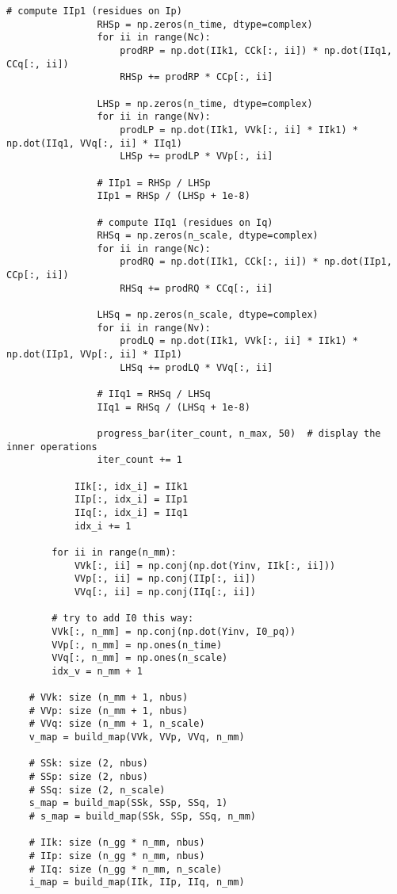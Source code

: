 \begin{lstlisting}[caption={Proper Generalized Decomposition code in Python}]
                # compute IIp1 (residues on Ip)
                RHSp = np.zeros(n_time, dtype=complex)
                for ii in range(Nc):
                    prodRP = np.dot(IIk1, CCk[:, ii]) * np.dot(IIq1, CCq[:, ii])
                    RHSp += prodRP * CCp[:, ii]

                LHSp = np.zeros(n_time, dtype=complex)
                for ii in range(Nv):
                    prodLP = np.dot(IIk1, VVk[:, ii] * IIk1) * np.dot(IIq1, VVq[:, ii] * IIq1)
                    LHSp += prodLP * VVp[:, ii]

                # IIp1 = RHSp / LHSp
                IIp1 = RHSp / (LHSp + 1e-8)

                # compute IIq1 (residues on Iq)
                RHSq = np.zeros(n_scale, dtype=complex)
                for ii in range(Nc):
                    prodRQ = np.dot(IIk1, CCk[:, ii]) * np.dot(IIp1, CCp[:, ii])
                    RHSq += prodRQ * CCq[:, ii]

                LHSq = np.zeros(n_scale, dtype=complex)
                for ii in range(Nv):
                    prodLQ = np.dot(IIk1, VVk[:, ii] * IIk1) * np.dot(IIp1, VVp[:, ii] * IIp1)
                    LHSq += prodLQ * VVq[:, ii]

                # IIq1 = RHSq / LHSq
                IIq1 = RHSq / (LHSq + 1e-8)

                progress_bar(iter_count, n_max, 50)  # display the inner operations
                iter_count += 1

            IIk[:, idx_i] = IIk1
            IIp[:, idx_i] = IIp1
            IIq[:, idx_i] = IIq1
            idx_i += 1

        for ii in range(n_mm):
            VVk[:, ii] = np.conj(np.dot(Yinv, IIk[:, ii]))
            VVp[:, ii] = np.conj(IIp[:, ii])
            VVq[:, ii] = np.conj(IIq[:, ii])

        # try to add I0 this way:
        VVk[:, n_mm] = np.conj(np.dot(Yinv, I0_pq))
        VVp[:, n_mm] = np.ones(n_time)
        VVq[:, n_mm] = np.ones(n_scale)
        idx_v = n_mm + 1

    # VVk: size (n_mm + 1, nbus)
    # VVp: size (n_mm + 1, nbus)
    # VVq: size (n_mm + 1, n_scale)
    v_map = build_map(VVk, VVp, VVq, n_mm)

    # SSk: size (2, nbus)
    # SSp: size (2, nbus)
    # SSq: size (2, n_scale)
    s_map = build_map(SSk, SSp, SSq, 1)
    # s_map = build_map(SSk, SSp, SSq, n_mm)

    # IIk: size (n_gg * n_mm, nbus)
    # IIp: size (n_gg * n_mm, nbus)
    # IIq: size (n_gg * n_mm, n_scale)
    i_map = build_map(IIk, IIp, IIq, n_mm)


\end{lstlisting}
